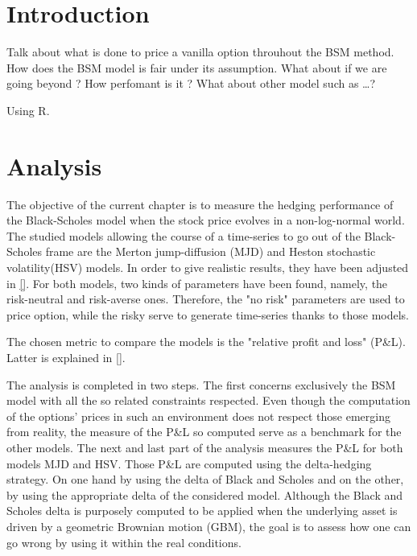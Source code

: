 \documentclass[12pt]{report}
\begin{document}

\tableofcontents{}



%
%
\chapter*{Introduction}
\label{cha:Introduction}

Talk about what is done to price a vanilla option throuhout the BSM method.
How does the BSM model is fair under its assumption. What about if we are going beyond ?
How perfomant is it ? 
What about other model such as \ldots ?

Using R. \cite{R}
\chapter{Analysis}
\label{cha:analysis}

The objective of the current chapter is to measure the hedging performance of the Black-Scholes model when the stock price evolves in a non-log-normal world.
The studied models allowing the course of a time-series to go out of the Black-Scholes frame are the Merton jump-diffusion (MJD) and Heston stochastic volatility(HSV) models.
In order to give realistic results, they have been adjusted in \cref{}. For both models, two kinds of parameters have been found, namely, the risk-neutral and risk-averse ones. Therefore, the "no risk" parameters are used to price option, while the risky serve to generate time-series thanks to those models.

The chosen metric to compare the models is the "relative profit and loss" (P\&L). Latter is explained in \cref{}.

The analysis is completed in two steps. The first concerns exclusively the BSM model with all the so related constraints respected. Even though the computation of the options' prices in such an environment does not respect those emerging from reality, the measure of the P\&L so computed serve as a benchmark for the other models.
The next and last part of the analysis measures the P\&L for both models MJD and HSV. Those P\&L are computed using the delta-hedging strategy. On one hand by using the delta of Black and Scholes and on the other, by using the appropriate delta of the considered model.
Although the Black and Scholes delta is purposely computed to be applied when the underlying asset is driven by a geometric Brownian motion (GBM), the goal is to assess how one can go wrong by using it within the real conditions.
\end{document}
